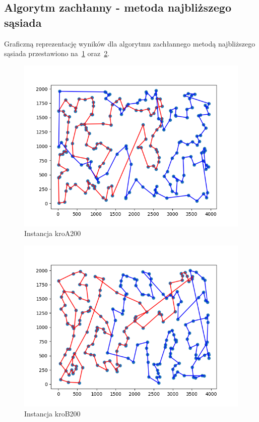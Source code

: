 \documentclass[11pt]{article}
\begin{document}
\subsection{Algorytm zachłanny - metoda najbliższego sąsiada}\label{subsec:algorytm-zachanny---metoda-najblizszego-sasiada2}
Graficzną reprezentację wyników dla algorytmu zachłannego metodą najbliższego sąsiada przestawiono na~\ref{fig:Greedy-nearest-kroA} oraz~\ref{fig:Greedy-nearest-kroB}.

\begin{figure}[H]
    \centering
    \includegraphics{best_paths/greedy_nearest_neighbor_kroA200.tsp.png}
    \caption{Instancja kroA200}
    \label{fig:Greedy-nearest-kroA}
\end{figure}
\begin{figure}[H]
    \centering
    \includegraphics{best_paths/greedy_nearest_neighbor_kroB200.tsp.png}
    \caption{Instancja kroB200}
    \label{fig:Greedy-nearest-kroB}
\end{figure}
\end{document}
